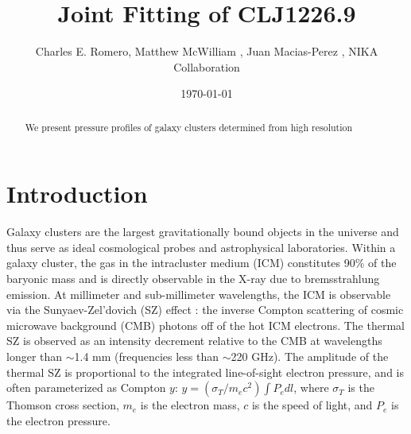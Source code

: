 \documentclass[iop,numberedappendix,apj]{emulateapj}
\begin{document}
\title{Joint Fitting of CLJ1226.9}
\author{
  Charles E. Romero,
  Matthew McWilliam ,
  Juan Macias-Perez ,
  NIKA Collaboration 
} 
\date{\today}



\begin{abstract}
We present pressure profiles of galaxy clusters determined from high resolution 
\end{abstract}


\maketitle

\section{Introduction}
\label{sec:intro}


Galaxy clusters are the largest gravitationally bound objects in the universe and thus serve as ideal cosmological probes 
and astrophysical laboratories. Within a galaxy cluster, the gas in the intracluster medium (ICM) constitutes 90\% of the
baryonic mass \citep{vikhlinin2006b} and is directly observable in the X-ray due to bremsstrahlung emission. 
At millimeter and sub-millimeter wavelengths, the ICM is observable via the Sunyaev-Zel'dovich (SZ) effect 
\citep{sunyaev1972}: the inverse Compton scattering of cosmic microwave background (CMB) photons off of
the hot ICM electrons. The thermal SZ is observed as an intensity decrement relative to the CMB at wavelengths longer 
than $\sim$1.4 mm (frequencies less than $\sim$220 GHz). The amplitude of the thermal SZ is proportional to the integrated
line-of-sight electron pressure, and is often parameterized as Compton $y$: $y = (\sigma_T / m_e c^2) \int P_e dl$, where
$\sigma_T$ is the Thomson cross section, $m_e$ is the electron mass, $c$ is the speed of light, and $P_e$ is the electron
pressure.
\end{document}
